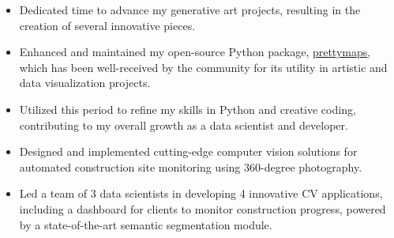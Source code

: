 \documentclass[10pt,a4paper]{altacv}
\begin{document}
{\iffalse
\cvevent{Machine Learning / Natural Language Processing / Operations Research Consultant}{IDS}{Jun 2023 --}{Pato Branco, Brazil}
\begin{itemize}
\item As a Machine Learning \& Natural Language Processing consultant, I collaborated with a Brazilian tech company in the design and implementation of assistant ChatBots informed by proprietary knowledge bases by leveraging OpenAI's paid API and pretrained Large Language Models such as GPT3.5. I also collaborated in the development of exact solutions for optimizing vehicle routing-like problems.
\item Tech stack:
\begin{enumerate}
    \item Programming Languages: Python
    \item ML \& Analytics: Pytorch \& Pytorch Lightning, Pandas, Scikit-learn, Numpy, Jupyter Notebooks, AWS Sagemaker
    \item NLP \& LLMs: OpenAI's API, HuggingFace models \& Transformers library, LangChain, BertTopic
    \item Deployment: Flask, Docker
    \item Combinatorial Optimization: Google OR-Tools
\end{enumerate}
\end{itemize}
\fi

\begin{itemize}
\item Dedicated time to advance my generative art projects, resulting in the creation of several innovative pieces.
\item Enhanced and maintained my open-source Python package, \href{https://github.com/marceloprates/prettymaps}{prettymaps}, which has been well-received by the community for its utility in artistic and data visualization projects.
\item Utilized this period to refine my skills in Python and creative coding, contributing to my overall growth as a data scientist and developer.
\end{itemize}

\divider


\begin{itemize}
\item Designed and implemented cutting-edge computer vision solutions for automated construction site monitoring using 360-degree photography.
\item Led a team of 3 data scientists in developing 4 innovative CV applications, including a dashboard for clients to monitor construction progress, powered by a state-of-the-art semantic segmentation module.
\end{itemize}

}
\end{document}
